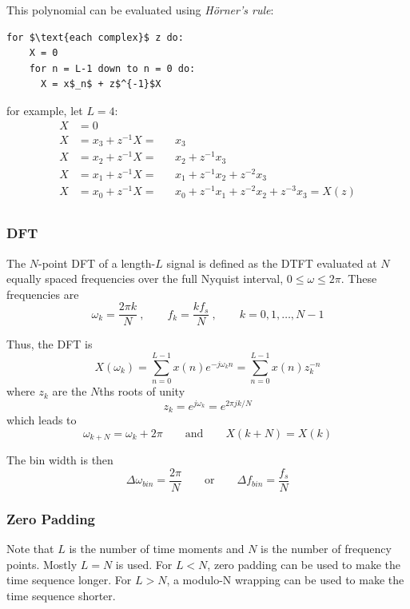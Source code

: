 This polynomial can be evaluated using \emph{Hörner's rule}:
\begin{lstlisting}[mathescape]
for $\text{each complex}$ z do:
	X = 0
	for n = L-1 down to n = 0 do:
	  X = x$_n$ + z$^{-1}$X
\end{lstlisting}
for example, let $L=4$:
\begin{align*}
	X &= 0 \\
	X &= x_3+z^{-1}X = && x_3 \\
	X &= x_2+z^{-1}X = && x_2+z^{-1}x_3 \\
	X &= x_1+z^{-1}X = && x_1+z^{-1}x_2+z^{-2}x_3 \\
	X &= x_0+z^{-1}X = && x_0+z^{-1}x_1+z^{-2}x_2+z^{-3}x_3 = X(z) \\
\end{align*}

\subsubsection{DFT}
The $N$-point DFT of a length-$L$ signal is defined as the DTFT evaluated
at $N$ equally spaced frequencies over the full Nyquist interval,
$0 \leq \omega \leq 2 \pi$. These frequencies are
\begin{equation*}
	\omega_k = \frac{2 \pi k}{N}\:, \qquad f_k = \frac{k f_s}{N} \:,\qquad k=0,1,\ldots,N-1
\end{equation*}

Thus, the DFT is
\begin{equation*}
	X(\omega_k) = \sum\limits_{n=0}^{L-1} x(n) e^{-j\omega_kn} = \sum\limits_{n=0}^{L-1} x(n)z_k^{-n}
\end{equation*}
where $z_k$ are the $N$ths roots of unity
\begin{equation*}
	z_k = e^{j\omega_k} = e^{2\pi j k / N}
\end{equation*}
which leads to
\begin{equation*}
	\omega_{k+N} = \omega_k + 2 \pi \qquad \text{and} \qquad X(k+N) = X(k)
\end{equation*}

The bin width is then
\begin{equation*}
	\Delta\omega_{bin}=\frac{2\pi}{N} \qquad \text{or} \qquad \Delta f_{bin}=\frac{f_s}{N}
\end{equation*}


\subsubsection{Zero Padding}
Note that $L$ is the number of time moments and $N$ is the number of
frequency points. Mostly $L=N$ is used. For $L<N$, zero padding can be used
to make the time sequence longer. For $L>N$, a modulo-N wrapping can be
used to make the time sequence shorter. \\

